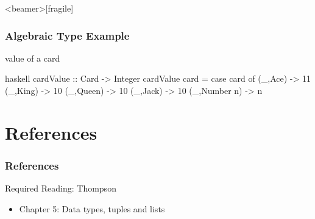 \documentclass[dvipsnames]{beamer}
\theoremstyle{plain}
\begin{document}
\begin{frame}<beamer>[fragile]
  \frametitle{Algebraic Type Example}

  \begin{exampleblock}{value of a card}
    \begin{pygments}{haskell}
cardValue :: Card -> Integer
cardValue card =
    case card of
      (_,Ace) -> 11
      (_,King) -> 10
      (_,Queen) -> 10
      (_,Jack) -> 10
      (_,Number n) -> n
    \end{pygments}
  \end{exampleblock}
\end{frame}

\section*{References}

\begin{frame}
  \frametitle{References}

  \begin{block}{Required Reading: Thompson}
    \begin{itemize}
      \item Chapter 5: \alert{Data types, tuples and lists}
    \end{itemize}
  \end{block}
\end{frame}
\end{document}
